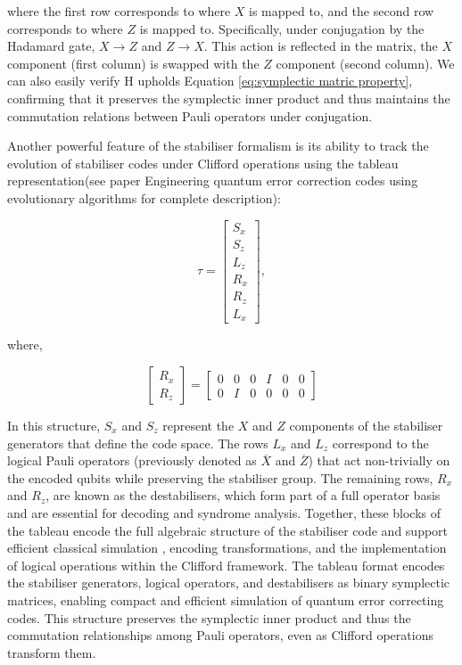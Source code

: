 where the first row corresponds to where \(X\) is mapped to,  and the second row corresponds to where \(Z\) is mapped to. Specifically, under conjugation by the Hadamard gate, \(X\rightarrow Z\) and \(Z\rightarrow X\). This action is reflected in the matrix, the \(X\) component (first column) is swapped with the \(Z\) component (second column). We can also easily verify H upholds Equation \ref{eq:symplectic matric property}, confirming that it preserves the symplectic inner product and thus maintains the commutation relations between Pauli operators under conjugation.

Another powerful feature of the stabiliser formalism is its ability to track the evolution of stabiliser codes under Clifford operations using the tableau representation(see paper Engineering quantum error correction codes using
evolutionary algorithms \cite{webster2024engineeringquantumerrorcorrection} for complete description):

\begin{equation}
    \tau=
    \begin{bmatrix}
        S_x \\
        S_z \\
        L_z \\
        R_x \\
        R_z \\
        L_x
    \end{bmatrix},
\end{equation}

where,

\begin{equation}
    \begin{bmatrix}
        R_x\\
        R_z
    \end{bmatrix}
    =
    \begin{bmatrix}
        0&0&0&I&0&0\\
        0&I&0&0&0&0
    \end{bmatrix}
\end{equation}

In this structure, \(S_x\) and \(S_z\) represent the \(X\) and \(Z\) components of the stabiliser generators that define the code space. The rows \(L_x\) and \(L_z\) correspond to the logical Pauli operators (previously denoted as \(\overline{X}\) and \(\overline{Z}\)) that act non-trivially on the encoded qubits while preserving the stabiliser group. The remaining rows, \(R_x\) and \(R_z\), are known as the destabilisers, which form part of a full operator basis and are essential for decoding and syndrome analysis. Together, these blocks of the tableau encode the full algebraic structure of the stabiliser code and support efficient classical simulation \cite{Aaronson_2004}, encoding transformations, and the implementation of logical operations within the Clifford framework.
The tableau format encodes the stabiliser generators, logical operators, and destabilisers as binary symplectic matrices, enabling compact and efficient simulation of quantum error correcting codes. This structure preserves the symplectic inner product and thus the commutation relationships among Pauli operators, even as Clifford operations transform them.

